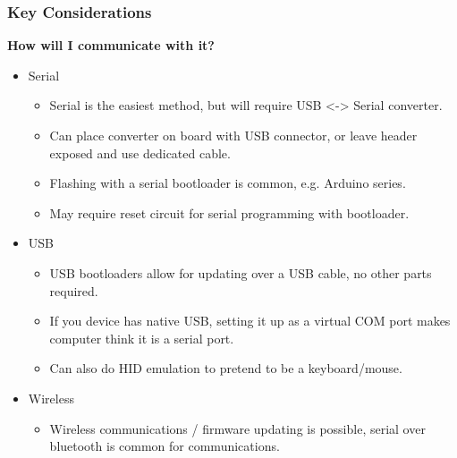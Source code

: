\documentclass[t]{beamer}
\begin{document}
 \begin{frame}
 \frametitle{Key Considerations}
 \large{\textbf{ How will I communicate with it?}}
 \vspace{1mm}
 \begin{itemize}
 	\item Serial
 	\begin{itemize} 
 		\item Serial is the easiest method, but will require USB <-> Serial converter. 
 		\item Can place converter on board with USB connector, or leave header exposed and use dedicated cable.
 		\item Flashing with a serial bootloader is common, e.g. Arduino series. 
 		\item May require reset circuit for serial programming with bootloader. 
 	\end{itemize} 
 	\item USB
 	\begin{itemize}
 		\item USB bootloaders allow for updating over a USB cable, no other parts required. 
 		\item If you device has native USB, setting it up as a virtual COM port makes computer think it is a serial port. 
 		\item Can also do HID emulation to pretend to be a keyboard/mouse. 
 	\end{itemize}
 	\item Wireless
 	\begin{itemize}
 		\item Wireless communications / firmware updating is possible, serial over bluetooth is common for communications. 
 	\end{itemize}
 \end{itemize}
\end{frame}

\end{document}
